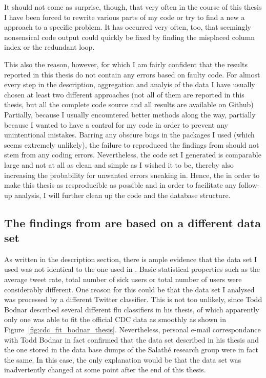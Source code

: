 \documentclass[11pt, a4paper]{article}\usepackage[]{graphicx}\usepackage[]{color}
\begin{document}
It should not come as surprise, though, that very often in the course of this thesis I have been forced to rewrite various parts of my code or try to find a new a approach to a specific problem. It has occurred very often, too, that seemingly nonsensical code output could quickly be fixed by finding the misplaced column index or the redundant loop.\newline

This also the reason, however, for which I am fairly confident that the results reported in this thesis do not contain any errors based on faulty code. For almost every step in the description, aggregation and analyis of the data I have usually chosen at least two different approaches (not all of them are reported in this thesis, but all the complete code source and all results are available on Github) Partially, because I usually encountered better methods along the way, partially because I wanted to have a control for my code in order to prevent any unintentional mistakes. Barring any obscure bugs in the packages I used (which seems extremely unlikely), the failure to reproduced the findings from \citep{bodnar_data_2015} should not stem from any coding errors. Nevertheless, the code set I generated is comparable large and not at all as clean and simple as I wished it to be, thereby also increasing the probability for unwanted errors sneaking in. Hence, the in order to make this thesis as resproducible as possible and in order to facilitate any follow-up analysis, I will further clean up the code and the database structure.\newline

\subsection{The findings from \citep{bodnar_data_2015} are based on a different data set}
As written in the description section, there is ample evidence that the data set I used was not identical to the one used in \citep{bodnar_data_2015}. Basic statistical properties such as the average tweet rate, total number of sick users or total number of users were considerably different. One reason for this could be that the data set I analysed was processed by a different Twitter classifier. This is not too unlikely, since Todd Bodnar described several different flu classifiers in his thesis, of which apparently only one was able to fit the official CDC data as smoothly as shown in Figure~\ref{fig:cdc_fit_bodnar_thesis}. Nevertheless, personal e-mail correspondance with Todd Bodnar in fact confirmed that the data set described in his thesis and the one stored in the data base dumps of the Salathé research group were in fact the same. In this case, the only explanation would be that the data set was inadvertently changed at some point after the end of this thesis.\newline
\end{document}
